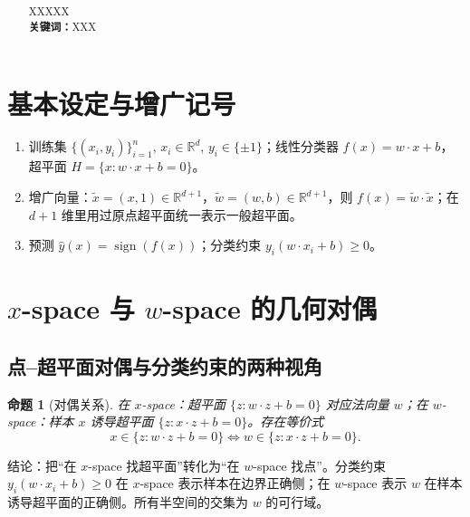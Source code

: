 \documentclass[10.5pt,hyperref,a4paper,UTF8]{ctexart}
\newtheorem{proposition}{命题}
\newcommand{\R}{\mathbb{R}}
\newcommand{\sign}{\operatorname{sign}}
\begin{document}
\cover

\begin{abstract}
%
XXXXX\\
\textbf{关键词：}XXX
%
\end{abstract}

\newpage
\tableofcontents
\thispagestyle{empty} %

\newpage
\setcounter{page}{1} %

\begin{center}
    \title{ \Huge \textbf{} }
\end{center}


\thispagestyle{empty} %


\section{基本设定与增广记号}
\begin{enumerate}
  \item 训练集 $\{(x_i,y_i)\}_{i=1}^n$, $x_i\in\R^d$, $y_i\in\{\pm1\}$；线性分类器 $f(x)=w\cdot x+b$，超平面 $H=\{x:w\cdot x+b=0\}$。
  \item 增广向量：$\tilde x=(x,1)\in\R^{d+1}$，$\tilde w=(w,b)\in\R^{d+1}$，则 $f(x)=\tilde w\cdot\tilde x$；在 $d{+}1$ 维里用过原点超平面统一表示一般超平面。
  \item 预测 $\hat y(x)=\sign(f(x))$；分类约束 $y_i(w\cdot x_i+b)\ge 0$。
\end{enumerate}

\section{$x$-space 与 $w$-space 的几何对偶}
\subsection{点–超平面对偶与分类约束的两种视角}
\begin{proposition}[对偶关系]
在 $x$-space：超平面 $\{z:w\cdot z+b=0\}$ 对应法向量 $w$；在 $w$-space：样本 $x$ 诱导超平面 $\{z:x\cdot z+b=0\}$。存在等价式
\[
x\in\{z:w\cdot z+b=0\}\iff w\in\{z:x\cdot z+b=0\}.
\]
\end{proposition}
\noindent 结论：把“在 $x$-space 找超平面”转化为“在 $w$-space 找点”。分类约束 $y_i(w\cdot x_i+b)\ge 0$ 在 $x$-space 表示样本在边界正确侧；在 $w$-space 表示 $w$ 在样本诱导超平面的正确侧。所有半空间的交集为 $w$ 的可行域。
\end{document}
